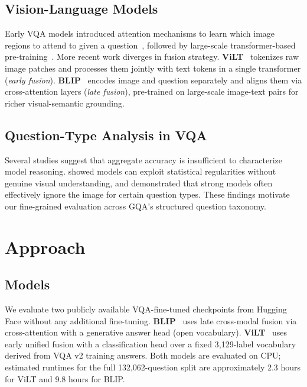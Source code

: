 \documentclass[11pt]{article}
\begin{document}
\subsection{Vision-Language Models}
Early VQA models introduced attention mechanisms to learn which image regions to attend to given a question~\cite{anderson2018bottom,yang2016stacked}, followed by large-scale transformer-based pre-training~\cite{lu2019vilbert,chen2020uniter}. More recent work diverges in fusion strategy. \textbf{ViLT}~\cite{kim2021vilt} tokenizes raw image patches and processes them jointly with text tokens in a single transformer (\textit{early fusion}). \textbf{BLIP}~\cite{li2022blip} encodes image and question separately and aligns them via cross-attention layers (\textit{late fusion}), pre-trained on large-scale image-text pairs for richer visual-semantic grounding.

\subsection{Question-Type Analysis in VQA}
Several studies suggest that aggregate accuracy is insufficient to characterize model reasoning. \citet{johnson2017clevr} showed models can exploit statistical regularities without genuine visual understanding, and \citet{agrawal2018don} demonstrated that strong models often effectively ignore the image for certain question types. These findings motivate our fine-grained evaluation across GQA's structured question taxonomy.

\section{Approach}

\subsection{Models}
We evaluate two publicly available VQA-fine-tuned checkpoints from Hugging Face without any additional fine-tuning. \textbf{BLIP}~\cite{li2022blip} uses late cross-modal fusion via cross-attention with a generative answer head (open vocabulary). \textbf{ViLT}~\cite{kim2021vilt} uses early unified fusion with a classification head over a fixed 3,129-label vocabulary derived from VQA v2 training answers. Both models are evaluated on CPU; estimated runtimes for the full 132,062-question split are approximately 2.3 hours for ViLT and 9.8 hours for BLIP.
\end{document}
